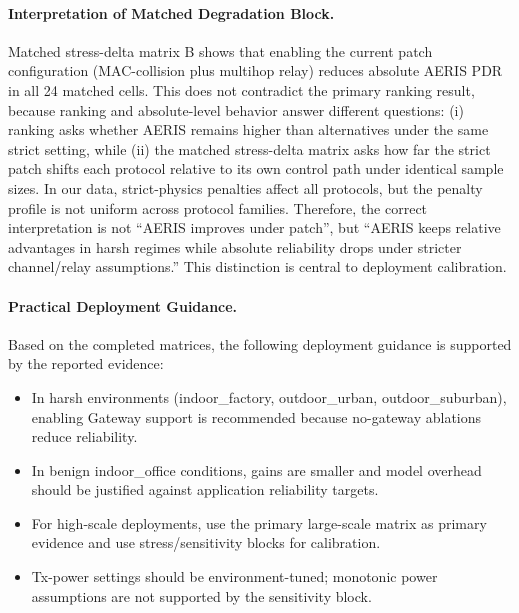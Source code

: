 ﻿\documentclass[sensors,article,submit,moreauthors,pdftex]{Definitions/mdpi}
\begin{document}
\paragraph{Interpretation of Matched Degradation Block.}
Matched stress-delta matrix B shows that enabling the current patch configuration (MAC-collision plus multihop relay) reduces absolute AERIS PDR in all 24 matched cells. This does not contradict the primary ranking result, because ranking and absolute-level behavior answer different questions: (i) ranking asks whether AERIS remains higher than alternatives under the same strict setting, while (ii) the matched stress-delta matrix asks how far the strict patch shifts each protocol relative to its own control path under identical sample sizes. In our data, strict-physics penalties affect all protocols, but the penalty profile is not uniform across protocol families. Therefore, the correct interpretation is not ``AERIS improves under patch'', but ``AERIS keeps relative advantages in harsh regimes while absolute reliability drops under stricter channel/relay assumptions.'' This distinction is central to deployment calibration.

\paragraph{Practical Deployment Guidance.}
Based on the completed matrices, the following deployment guidance is supported by the reported evidence:
\begin{itemize}
\item In harsh environments (indoor\_factory, outdoor\_urban, outdoor\_suburban), enabling Gateway support is recommended because no-gateway ablations reduce reliability.
\item In benign indoor\_office conditions, gains are smaller and model overhead should be justified against application reliability targets.
\item For high-scale deployments, use the primary large-scale matrix as primary evidence and use stress/sensitivity blocks for calibration.
\item Tx-power settings should be environment-tuned; monotonic power assumptions are not supported by the sensitivity block.
\end{itemize}
\end{document}
